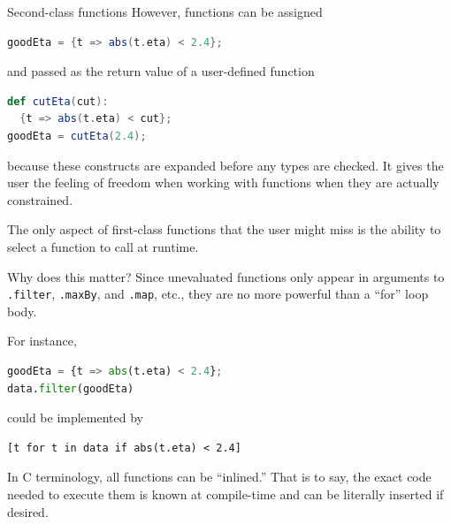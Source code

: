 \documentclass{beamer}
\begin{document}
\begin{frame}[fragile]{Second-class functions}
\vspace{0.5 cm}
However, functions can be assigned
\begin{center}
\begin{minipage}{0.9\linewidth}
\small
\begin{lstlisting}[language=scala]
goodEta = {t => abs(t.eta) < 2.4};
\end{lstlisting}
\end{minipage}
\end{center}
and passed as the return value of a user-defined function
\begin{center}
\begin{minipage}{0.9\linewidth}
\small
\begin{lstlisting}[language=scala]
def cutEta(cut):
  {t => abs(t.eta) < cut};
goodEta = cutEta(2.4);
\end{lstlisting}
\end{minipage}
\end{center}
because these constructs are expanded before any types are checked. It gives the user the feeling of freedom when working with functions when they are actually constrained.

\vspace{0.5 cm}
The only aspect of first-class functions that the user might miss is the ability to select a function to call at runtime.
\end{frame}

\begin{frame}[fragile]{Why does this matter?}
\vspace{0.5 cm}
Since unevaluated functions only appear in arguments to {\tt .filter}, {\tt .maxBy}, and {\tt .map}, etc., they are no more powerful than a ``for'' loop body.

\vspace{0.25 cm}
For instance,
\begin{center}
\begin{minipage}{0.9\linewidth}
\small
\begin{lstlisting}[language=python]
goodEta = {t => abs(t.eta) < 2.4};
data.filter(goodEta)
\end{lstlisting}
\end{minipage}
\end{center}
could be implemented by
\begin{center}
\begin{minipage}{0.9\linewidth}
\small
\begin{verbatim}
[t for t in data if abs(t.eta) < 2.4]
\end{verbatim}
\end{minipage}
\end{center}
In C terminology, all functions can be ``inlined.'' That is to say, the exact code needed to execute them is known at compile-time and can be literally inserted if desired.
\end{frame}
\end{document}

